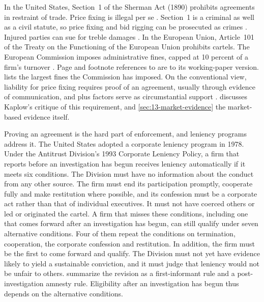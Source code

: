 In the United States, Section~1 of the Sherman Act (1890) prohibits agreements in restraint of trade. Price fixing
is illegal per se \citep[p.~570]{Miller2010}. Section~1 is a criminal as well as a civil statute, so price fixing
and bid rigging can be prosecuted as crimes \citep[ch.~4, p.~74, footnote~13]{Kaplow2013}. Injured parties can sue for treble damages
\citep[p.~759]{Asker2010}.
In the European Union, Article~101 of the Treaty on the Functioning of the European Union prohibits cartels. The
European Commission imposes administrative fines, capped at 10 percent of a firm's turnover
\citep[p.~6]{ChenRey2013}. Page and footnote references to \citet{ChenRey2013} are to its working-paper version.
 lists the largest fines the Commission has imposed. On the conventional view, liability for
price fixing requires proof of an agreement, usually through evidence of communication, and plus factors serve as
circumstantial support \citep[pp.~4, 21 and 109--110]{Kaplow2013}.  discusses Kaplow's critique of
this requirement, and \cref{sec:13-market-evidence} the market-based evidence itself.

Proving an agreement is the hard part of enforcement, and leniency programs address it. The United States adopted a
corporate leniency program in 1978. Under the Antitrust Division's 1993 Corporate Leniency Policy, a firm that
reports before an investigation has begun receives leniency automatically if it meets six conditions. The Division
must have no information about the conduct from any other source. The firm must end its participation promptly,
cooperate fully and make restitution where possible, and its confession must be a corporate act rather than that of
individual executives. It must not have coerced others or led or originated the cartel. A firm
that misses these conditions, including one that comes forward after an investigation has begun, can still qualify
under seven alternative conditions. Four of them repeat the conditions on termination, cooperation, the corporate
confession and restitution. In addition, the firm must be the first to come forward and qualify. The Division must not yet
have evidence likely to yield a sustainable conviction, and it must judge that leniency would not be unfair to
others. \citet[p.~1]{ChenRey2013} summarize the revision as a first-informant rule and a post-investigation amnesty
rule. Eligibility after an investigation has begun thus depends on the alternative conditions.

